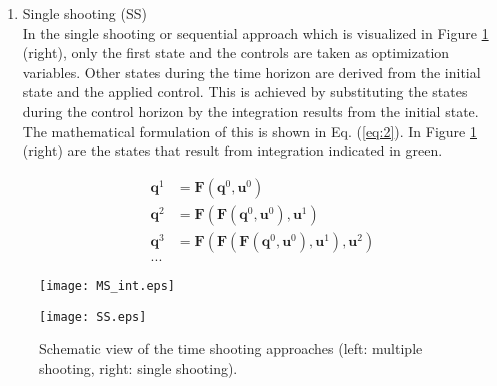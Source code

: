 \begin{enumerate}
%	
	\item Single shooting (SS)\\  
	In the single shooting or sequential approach which is visualized in Figure \ref{fig:TS} (right), only the first state and the controls are taken as optimization variables. Other states during the time horizon are derived from the initial state and the applied control. This is achieved by substituting the states during the control horizon by the integration results from the initial state. The mathematical formulation of this is shown in Eq. (\ref{eq:2}). In Figure \ref{fig:TS} (right) are the states that result from integration indicated in green. \cite{Gillis2019}
	
	\begin{equation}\label{eq:2}
	\begin{aligned}
	\bm{q}^1 &= \bm{F}(\bm{q}^0, \bm{u}^0)\\
	\bm{q}^2 &= \bm{F}(\bm{F}(\bm{q}^0, \bm{u}^0), \bm{u}^1)\\
	\bm{q}^3 &= \bm{F}(\bm{F}(\bm{F}(\bm{q}^0, \bm{u}^0), \bm{u}^1), \bm{u}^2)\\
	...
	\end{aligned}
	\end{equation}
\end{enumerate}

\begin{figure}[htp]
	\centering
	\begin{minipage}{0.49\textwidth}
		\centering
		\texttt{[image: MS\_int.eps]}
	\end{minipage}
	\hfill
	\begin{minipage}{.49\textwidth}
		\centering
		\texttt{[image: SS.eps]}
	\end{minipage}
	\caption{Schematic view of the time shooting approaches (left: multiple shooting, right: single shooting).}
	\label{fig:TS}
\end{figure}

